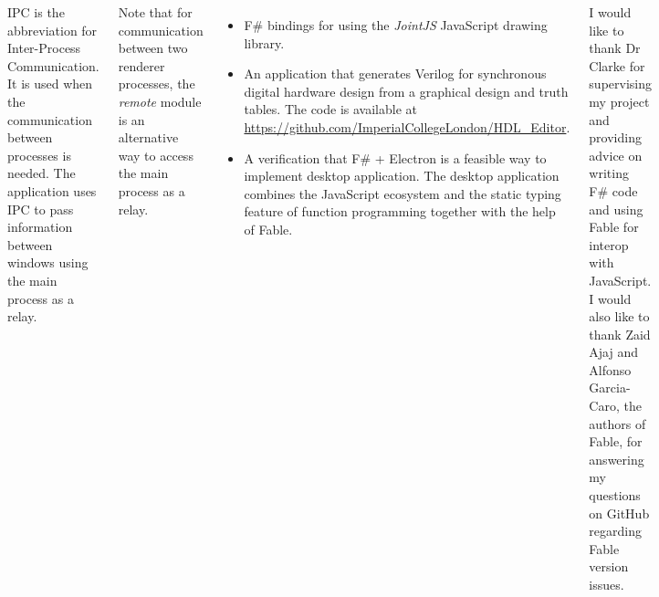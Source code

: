 \documentclass[12pt, a1paper, landscape, margin=10mm, innermargin=15mm, blockverticalspace=15mm, colspace=15mm, subcolspace=8mm]{tikzposter}
\newcommand*\circled[1]{\tikz[baseline=(char.base)]{
            \node[shape=circle,draw,inner sep=1pt] (char) {#1};}}
\begin{document}
\begin{columns}
{


IPC is the abbreviation for Inter-Process Communication. It is used when the communication between processes is needed. The application uses IPC to pass information between windows using the main process as a relay.

Note that for communication between two renderer processes, the \textit{remote} module is an alternative way to access the main process as a relay.

    }
    
    {
    \begin{itemize}
        \item F\# bindings for using the  \textit{JointJS} JavaScript drawing library.
        \item An application that generates Verilog for synchronous digital hardware design from a graphical design and truth tables. The code is available at \url{https://github.com/ImperialCollegeLondon/HDL_Editor}.
        \item A verification that F\# + Electron is a feasible way to implement desktop application. The desktop application combines the JavaScript ecosystem and the static typing feature of function programming together with the help of Fable.
    \end{itemize}
    }
    
    {
    I would like to thank Dr Clarke for supervising my project and providing advice on writing F\# code and using Fable for interop with JavaScript. I would also like to thank Zaid Ajaj and Alfonso Garcia-Caro, the authors of Fable, for answering my questions on GitHub regarding Fable version issues.
    }
    
\end{columns}
 
\end{document}
